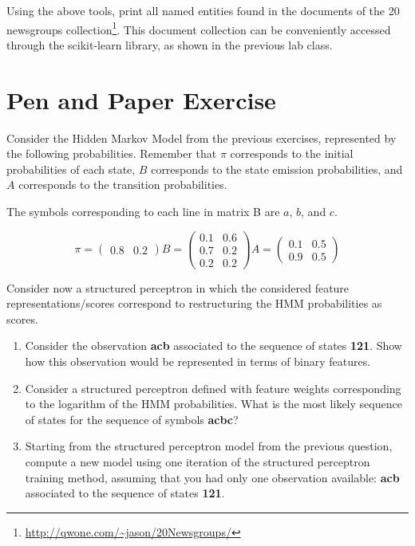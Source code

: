 \documentclass[12pt]{article}
\begin{document}
Using the above tools, print all named entities found in the documents of the 20 newsgroups collection\footnote{ \url{http://qwone.com/~jason/20Newsgroups/}}. This document collection can be conveniently accessed through the scikit-learn library, as shown in the previous lab class.

\section{Pen and Paper Exercise}

Consider the Hidden Markov Model from the previous exercises, represented by the following probabilities. Remember that $\pi$ corresponds to the initial probabilities of each state, $B$ corresponds to the state emission probabilities, and $A$ corresponds to the transition probabilities. 

The symbols corresponding to each line in matrix B are $a$, $b$, and $c$.

\begin{displaymath}
    \pi = 
    \begin{pmatrix}
        0.8 & 0.2
    \end{pmatrix}
    B = 
    \begin{pmatrix}
        0.1 & 0.6 \\
        0.7 & 0.2 \\
        0.2 & 0.2 
    \end{pmatrix}
    A = 
    \begin{pmatrix}
        0.1 & 0.5 \\
        0.9 & 0.5
    \end{pmatrix}
\end{displaymath}

Consider now a structured perceptron in which the considered feature representations/scores correspond to restructuring the HMM probabilities as scores.

\begin{enumerate}
\item Consider the observation \textbf{acb} associated to the sequence of states {\bf 121}. Show how this observation would be represented in terms of binary features.

\item Consider a structured perceptron defined with feature weights corresponding to the logarithm of the HMM probabilities. What is the most likely sequence of states for the sequence of symbols {\bf acbc}?

\item Starting from the structured perceptron model from the previous question, compute a new model using one iteration of the structured perceptron training method, assuming that you had only one observation available: \textbf{acb} associated to the sequence of states {\bf 121}.
\end{enumerate}
\end{document}
